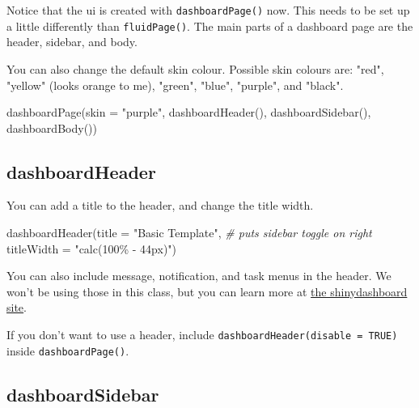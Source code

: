 \documentclass[
  oneside]{book}
\newenvironment{Shaded}{\begin{snugshade}}{\end{snugshade}}
\newcommand{\AttributeTok}[1]{\textcolor[rgb]{0.77,0.63,0.00}{#1}}
\newcommand{\CommentTok}[1]{\textcolor[rgb]{0.56,0.35,0.01}{\textit{#1}}}
\newcommand{\FunctionTok}[1]{\textcolor[rgb]{0.00,0.00,0.00}{#1}}
\newcommand{\NormalTok}[1]{#1}
\newcommand{\StringTok}[1]{\textcolor[rgb]{0.31,0.60,0.02}{#1}}
\begin{document}
Notice that the ui is created with \texttt{dashboardPage}\texttt{()} now. This needs to be set up a little differently than \texttt{fluidPage}\texttt{()}. The main parts of a dashboard page are the header, sidebar, and body.

You can also change the default \AttributeTok{skin} colour. Possible skin colours are: \StringTok{"red"}, \StringTok{"yellow"} (looks orange to me), \StringTok{"green"}, \StringTok{"blue"}, \StringTok{"purple"}, and \StringTok{"black"}.

\begin{Shaded}
\begin{Highlighting}[]
\FunctionTok{dashboardPage}\NormalTok{(}\AttributeTok{skin =} \StringTok{"purple"}\NormalTok{, }\FunctionTok{dashboardHeader}\NormalTok{(), }\FunctionTok{dashboardSidebar}\NormalTok{(), }\FunctionTok{dashboardBody}\NormalTok{())}
\end{Highlighting}
\end{Shaded}

\hypertarget{dashboardheader}{%
\subsection{dashboardHeader}\label{dashboardheader}}

You can add a title to the header, and change the title width.

\begin{Shaded}
\begin{Highlighting}[]
\FunctionTok{dashboardHeader}\NormalTok{(}\AttributeTok{title =} \StringTok{"Basic Template"}\NormalTok{,}
                \CommentTok{\# puts sidebar toggle on right}
                \AttributeTok{titleWidth =} \StringTok{"calc(100\% {-} 44px)"}\NormalTok{)}
\end{Highlighting}
\end{Shaded}

You can also include message, notification, and task menus in the header. We won't be using those in this class, but you can learn more at \href{https://rstudio.github.io/shinydashboard/structure.html\#message-menus}{the shinydashboard site}.

\begin{info}
If you don't want to use a header, include \texttt{dashboardHeader(disable\ =\ TRUE)} inside \texttt{dashboardPage}\texttt{()}.

\end{info}

\hypertarget{dashboardsidebar}{%
\subsection{dashboardSidebar}\label{dashboardsidebar}}
\end{document}

